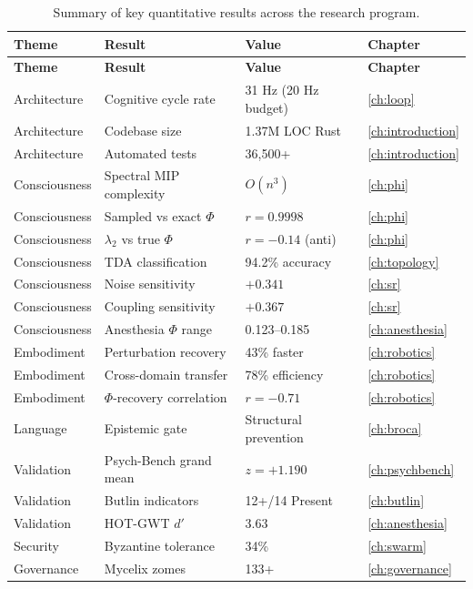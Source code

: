 \documentclass[12pt]{book}
\begin{document}
\begin{longtable}{p{3.5cm}p{4cm}p{3.5cm}l}
\caption{Summary of key quantitative results across the research program.}
\label{tab:key-results} \\
\toprule
\textbf{Theme} & \textbf{Result} & \textbf{Value} & \textbf{Chapter} \\
\midrule
\endfirsthead
\toprule
\textbf{Theme} & \textbf{Result} & \textbf{Value} & \textbf{Chapter} \\
\midrule
\endhead
Architecture & Cognitive cycle rate & 31 Hz (20 Hz budget) & \ref{ch:loop} \\
Architecture & Codebase size & 1.37M LOC Rust & \ref{ch:introduction} \\
Architecture & Automated tests & 36,500+ & \ref{ch:introduction} \\
Consciousness & Spectral MIP complexity & $O(n^3)$ & \ref{ch:phi} \\
Consciousness & Sampled vs exact $\Phi$ & $r = 0.9998$ & \ref{ch:phi} \\
Consciousness & $\lambda_2$ vs true $\Phi$ & $r = -0.14$ (anti) & \ref{ch:phi} \\
Consciousness & TDA classification & 94.2\% accuracy & \ref{ch:topology} \\
Consciousness & Noise sensitivity & $+0.341$ & \ref{ch:sr} \\
Consciousness & Coupling sensitivity & $+0.367$ & \ref{ch:sr} \\
Consciousness & Anesthesia $\Phi$ range & 0.123--0.185 & \ref{ch:anesthesia} \\
Embodiment & Perturbation recovery & 43\% faster & \ref{ch:robotics} \\
Embodiment & Cross-domain transfer & 78\% efficiency & \ref{ch:robotics} \\
Embodiment & $\Phi$-recovery correlation & $r = -0.71$ & \ref{ch:robotics} \\
Language & Epistemic gate & Structural prevention & \ref{ch:broca} \\
Validation & Psych-Bench grand mean & $z = +1.190$ & \ref{ch:psychbench} \\
Validation & Butlin indicators & 12+/14 Present & \ref{ch:butlin} \\
Validation & HOT-GWT $d'$ & 3.63 & \ref{ch:anesthesia} \\
Security & Byzantine tolerance & 34\% & \ref{ch:swarm} \\
Governance & Mycelix zomes & 133+ & \ref{ch:governance} \\

\end{longtable}
\end{document}
